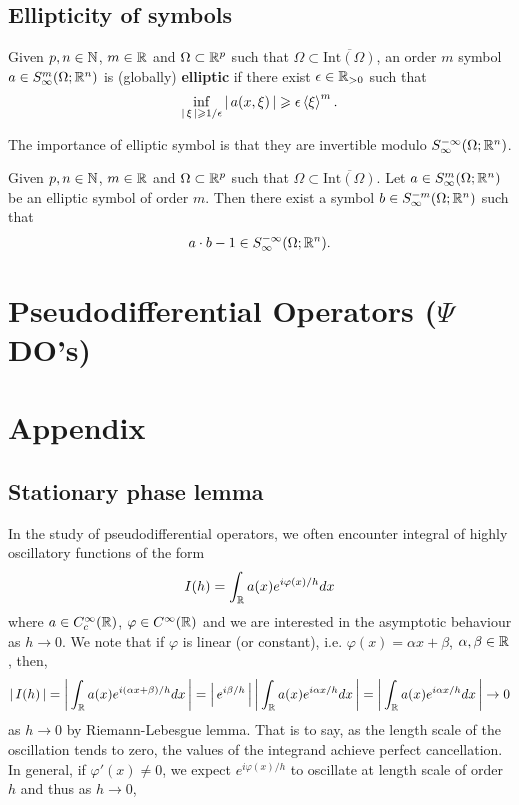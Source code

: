 \documentclass{article}
\begin{document}
\subsection{Ellipticity of symbols}
\begin{fdefinition}
    Given $p, n \in \N$, $m \in \R$ and $\Omega \subset \R^p$ such that $\Omega \subset \overline{\mathrm{Int}(\Omega)}$, an order $m$ symbol $a \in S^m_\infty(\Omega; \R^n)$ is (globally) \textbf{elliptic} if there exist $\epsilon \in \R_{>0}$ such that 
    \[
        \inf_{\abs{\xi} \geq 1/\epsilon} \abs{a(x, \xi)} \geq \epsilon \sym[\xi]^m. 
    \]
\end{fdefinition}
The importance of elliptic symbol is that they are invertible modulo $S^{-\infty}_\infty(\Omega; \R^n)$. 

\begin{flemma}
    Given $p, n \in \N$, $m \in \R$ and $\Omega \subset \R^p$ such that $\Omega \subset \overline{\mathrm{Int}(\Omega)}$. Let $a \in S^m_\infty(\Omega; \R^n)$ be an elliptic symbol of order $m$. Then there exist a symbol $b \in S^{-m}_\infty(\Omega; \R^n)$ such that 
    \[
    a \cdot b - 1 \in S^{-\infty}_\infty(\Omega; \R^n). 
    \]
\end{flemma}



\section{Pseudodifferential Operators ($\Psi$DO's)}



\section{Appendix}
\subsection{Stationary phase lemma} 
In the study of pseudodifferential operators, we often encounter integral of highly oscillatory functions of the form
    \begin{align*}
    I(h) = \int_\R a(x) e^{i \varphi(x) /h} dx
    \end{align*}
where $a \in C^\infty_c(\R)$, $\varphi \in C^\infty(\R)$ and we are interested in the asymptotic behaviour as $h \to 0$. We note that if $\varphi$ is linear (or constant), i.e. $\varphi(x) = \alpha x+ \beta$, $\alpha, \beta \in \R$, then, 
\begin{align*}
   \abs{I(h)} = \abs{\int_\R a(x) e^{i (\alpha x + \beta) /h} dx} = \abs{e^{i \beta/h}} \abs{\int_\R a(x) e^{i \alpha x /h} dx} =  \abs{\int_\R a(x) e^{i \alpha x /h} dx} \to 0
\end{align*}
as $h \to 0$ by Riemann-Lebesgue lemma. That is to say, as the length scale of the oscillation tends to zero, the values of the integrand achieve perfect cancellation. In general, if $\varphi'(x) \neq 0$, we expect $e^{i\varphi(x)/h}$ to oscillate at length scale of order $h$ and thus as $h \to 0$, 
\end{document}
